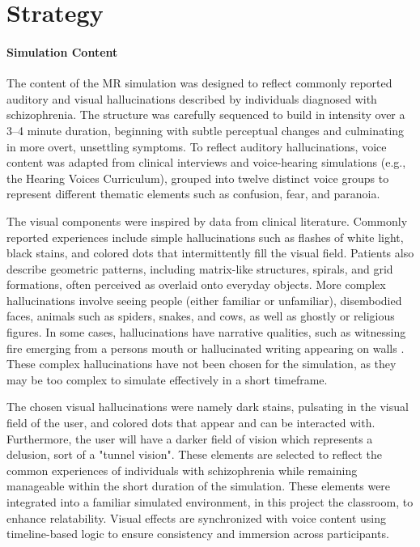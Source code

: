 \section{Strategy}

\paragraph{Simulation Content} The content of the MR simulation was designed to reflect commonly reported auditory and visual hallucinations described by individuals diagnosed with schizophrenia. The structure was carefully sequenced to build in intensity over a 3--4 minute duration, beginning with subtle perceptual changes and culminating in more overt, unsettling symptoms. To reflect auditory hallucinations, voice content was adapted from clinical interviews and voice-hearing simulations (e.g., the Hearing Voices Curriculum), grouped into twelve distinct voice groups to represent different thematic elements such as confusion, fear, and paranoia.

\vspace{1em}

The visual components were inspired by data from clinical literature. Commonly reported experiences include simple hallucinations such as flashes of white light, black stains, and colored dots that intermittently fill the visual field. Patients also describe geometric patterns, including matrix-like structures, spirals, and grid formations, often perceived as overlaid onto everyday objects. More complex hallucinations involve seeing people (either familiar or unfamiliar), disembodied faces, animals such as spiders, snakes, and cows, as well as ghostly or religious figures. In some cases, hallucinations have narrative qualities, such as witnessing fire emerging from a persons mouth or hallucinated writing appearing on walls \cite{Vanommen2019,Silverstein2021}. These complex hallucinations have not been chosen for the simulation, as they may be too complex to simulate effectively in a short timeframe.

\vspace{1em}

The chosen visual hallucinations were namely dark stains, pulsating in the visual field of the user, and colored dots that appear and can be interacted with. Furthermore, the user will have a darker field of vision which represents a delusion, sort of a "tunnel vision". These elements are selected to reflect the common experiences of individuals with schizophrenia while remaining manageable within the short duration of the simulation.  These elements were integrated into a familiar simulated environment, in this project the classroom, to enhance relatability. Visual effects are synchronized with voice content using timeline-based logic to ensure consistency and immersion across participants.

